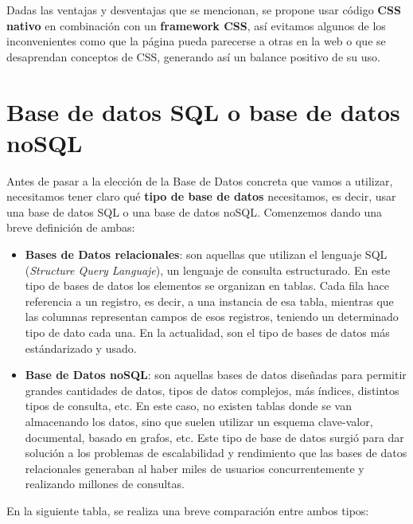 Dadas las ventajas y desventajas que se mencionan, se propone usar código \textbf{CSS nativo}
en combinación con un \textbf{framework CSS}, así evitamos algunos de los inconvenientes como
que la página pueda parecerse a otras en la web o que se desaprendan conceptos de CSS,
generando así un balance positivo de su uso.

\section{Base de datos SQL o base de datos noSQL} \label{sec:sql-nosql}
Antes de pasar a la elección de la Base de Datos concreta que vamos a utilizar, necesitamos
tener claro qué \textbf{tipo de base de datos} necesitamos, es decir, usar una base de datos
SQL o una base de datos noSQL. Comenzemos dando una breve definición de ambas:
    
    \begin{itemize}
        \item \textbf{Bases de Datos relacionales}: son aquellas que utilizan el lenguaje SQL
        (\textit{Structure Query Languaje}), un lenguaje de consulta estructurado. En este tipo
        de bases de datos los elementos se organizan en tablas. Cada fila hace referencia a un
        registro, es decir, a una instancia de esa tabla, mientras que las columnas representan
        campos de esos registros, teniendo un determinado tipo de dato cada una. En la
        actualidad, son el tipo de bases de datos más estándarizado y usado.
        \item \textbf{Base de Datos noSQL}: son aquellas bases de datos diseñadas para
        permitir grandes cantidades de datos, tipos de datos complejos, más índices,
        distintos tipos de consulta, etc. En este caso, no existen tablas donde se van
        almacenando los datos, sino que suelen utilizar un esquema clave-valor, documental,
        basado en grafos, etc. Este tipo de base de datos surgió para dar solución a los
        problemas de escalabilidad y rendimiento que las bases de datos relacionales
        generaban al haber miles de usuarios concurrentemente y realizando millones de
        consultas.
    \end{itemize}

En la siguiente tabla, se realiza una breve comparación entre ambos tipos: 

